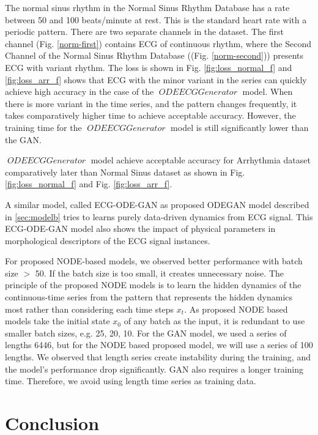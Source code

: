 \documentclass{article}
\DeclareMathOperator{\ODEECGGenerator}{\textit{ODEECGGenerator}}
\begin{document}
The normal sinus rhythm in the Normal Sinus Rhythm Database has a rate between 50 and 100 beats/minute at rest. This is the standard heart rate with a periodic pattern. There are two separate channels in the dataset. The first channel (Fig. \ref{norm-first}) contains ECG of continuous rhythm, where the Second Channel of the Normal Sinus Rhythm Database ((Fig. \ref{norm-second})) presents ECG with variant rhythm. The loss is shown in Fig. \ref{fig:loss_normal_f} and \ref{fig:loss_arr_f} shows that ECG with the minor variant in the series can quickly achieve high accuracy in the case of the  $\ODEECGGenerator$ model. When there is more variant in the time series, and the pattern changes frequently, it takes comparatively higher time to achieve acceptable accuracy.  
However, the training time for the  $\ODEECGGenerator$ model is still significantly lower than the GAN. 


 $\ODEECGGenerator$ model achieve acceptable accuracy  for Arrhythmia dataset comparatively later than Normal Sinus dataset as shown in Fig. \ref{fig:loss_normal_f} and Fig. \ref{fig:loss_arr_f}. 


A similar model, called ECG-ODE-GAN \cite{golany2021ecg} as proposed ODEGAN model described in \ref{sec:modelb} tries to learns purely data-driven dynamics from ECG signal. This  ECG-ODE-GAN model also shows the impact of physical parameters in morphological descriptors of the ECG signal instances.


For proposed NODE-based models, we observed better performance with batch size $>$ 50. If the batch size is too small, it creates unnecessary noise. The principle of the proposed NODE models is to learn the hidden dynamics of the continuous-time series from the pattern that represents the hidden dynamics most rather than considering each time steps $x_{t}$. As proposed NODE based models take the initial state $x_{0}$ of any batch as the input, it is redundant to use smaller batch sizes, e.g. 25, 20, 10. For the GAN model, we used a series of lengths 6446, but for the NODE based proposed model, we will use a series of 100 lengths. We observed that length series create instability during the training, and the model's performance drop significantly. GAN also requires a longer training time. Therefore, we avoid using length time series as training data. 
\clearpage
\section{Conclusion}
\end{document}
